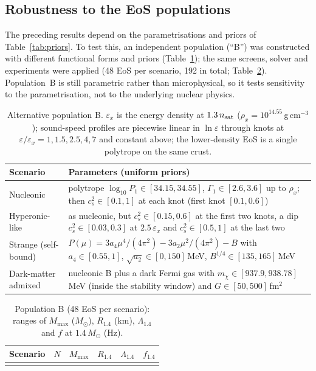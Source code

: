 \documentclass[11pt,a4paper]{article}
\newcommand{\Msun}{M_\odot}
\begin{document}
\subsection{Robustness to the EoS populations}\label{sec:popB}
The preceding results depend on the parametrisations and priors of Table~\ref{tab:priors}. To test this, an independent population (``B'') was constructed with different functional forms and priors (Table~\ref{tab:priorsB}); the same screens, solver and experiments were applied (48 EoS per scenario, 192 in total; Table~\ref{tab:popBdata}). Population~B is still parametric rather than microphysical, so it tests sensitivity to the parametrisation, not to the underlying nuclear physics.
\begin{table}[t]\centering\small
\caption{Alternative population B. $\varepsilon_x$ is the energy density at $1.3\,n_{\rm sat}$ ($\rho_x=10^{14.55}$\,g\,cm$^{-3}$); sound-speed profiles are piecewise linear in $\ln\varepsilon$ through knots at $\varepsilon/\varepsilon_x=1,1.5,2.5,4,7$ and constant above; the lower-density EoS is a single polytrope on the same crust.}\label{tab:priorsB}
\begin{tabular}{>{\raggedright\arraybackslash}p{}p{}}\toprule
Scenario & Parameters (uniform priors)\\\midrule
Nucleonic & polytrope $\log_{10}P_1\in[34.15,34.55]$, $\Gamma_1\in[2.6,3.6]$ up to $\rho_x$; then $c_s^2\in[0.1,1]$ at each knot (first knot $[0.1,0.6]$)\\
Hyperonic-like & as nucleonic, but $c_s^2\in[0.15,0.6]$ at the first two knots, a dip $c_s^2\in[0.03,0.3]$ at $2.5\,\varepsilon_x$ and $c_s^2\in[0.5,1]$ at the last two\\
Strange (self-bound) & $P(\mu)=3a_4\mu^4/(4\pi^2)-3a_2\mu^2/(4\pi^2)-B$ with $a_4\in[0.55,1]$, $\sqrt{a_2}\in[0,150]$\,MeV, $B^{1/4}\in[135,165]$\,MeV\\
Dark-matter admixed & nucleonic B plus a dark Fermi gas with $m_\chi\in[937.9,938.78]$\,MeV (inside the stability window) and $G\in[50,500]$\,fm$^2$\\\bottomrule\end{tabular}\end{table}
\begin{table}[t]\centering\small
\caption{Population B (48 EoS per scenario): ranges of $M_{\max}$ ($\Msun$), $R_{1.4}$ (km), $\Lambda_{1.4}$ and $f$ at $1.4\,\Msun$ (Hz).}\label{tab:popBdata}
\begin{tabular}{lrrrrr}\toprule
Scenario & $N$ & $M_{\max}$ & $R_{1.4}$ & $\Lambda_{1.4}$ & $f_{1.4}$\\\midrule\\\bottomrule\end{tabular}\end{table}
\end{document}
